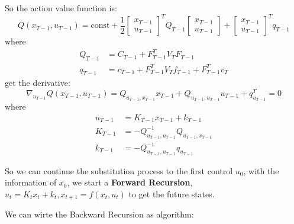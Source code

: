 \documentclass[10pt]{elegantbook}
\begin{document}
So the action value function is:
\[
Q(x_{T-1}, u_{T-1}) = \text{const} + \frac{1}{2}
\begin{bmatrix}
x_{T-1} \\
u_{T-1}
\end{bmatrix}^T
Q_{T-1}
\begin{bmatrix}
x_{T-1} \\
u_{T-1}
\end{bmatrix}
+ \begin{bmatrix}
x_{T-1} \\
u_{T-1}
\end{bmatrix}^T q_{T-1}
\]
where
\begin{align*}
Q_{T-1} &= C_{T-1} + F_{T-1}^T V_T F_{T-1} \\
q_{T-1} &= c_{T-1} + F_{T-1}^T V_T f_{T-1} + F_{T-1}^T v_T
\end{align*}
get the derivative:
\[
\nabla_{u_{T-1}} Q(x_{T-1}, u_{T-1}) =
Q_{u_{T-1}, x_{T-1}} x_{T-1} + Q_{u_{T-1}, u_{T-1}} u_{T-1} + q_{u_{T-1}}^T = 0
\]
where
\begin{align*}
u_{T-1} &= K_{T-1} x_{T-1} + k_{T-1} \\
K_{T-1} &= -Q_{u_{T-1}, u_{T-1}}^{-1} Q_{u_{T-1}, x_{T-1}} \\
k_{T-1} &= -Q_{u_{T-1}, u_{T-1}}^{-1} q_{u_{T-1}}
\end{align*}

So we can continue the substitution process to the first control $u_0$, with the information of $x_0$,
we start a \textbf{Forward Recursion}, $u_t = K_tx_t + k_t, x_{t+1} = f(x_t, u_t)$ to get the future states.

We can wirte the Backward Recursion as algorithm:
\end{document}
